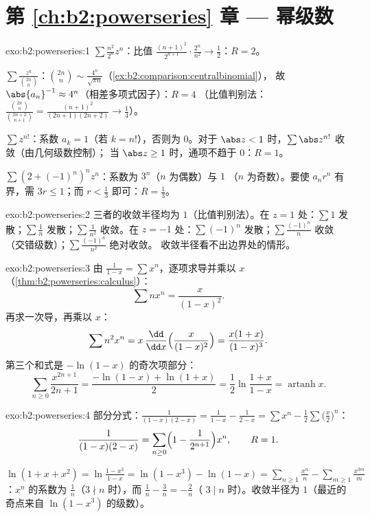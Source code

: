 \section*{第 \ref{ch:b2:powerseries} 章 --- 幂级数}

\begin{solution}{exo:b2:powerseries:1}
$\sum \frac{n^2}{2^n}z^n$：比值 $\frac{(n+1)^2}{2^{n+1}}\cdot
\frac{2^n}{n^2} \to \frac12$：$R = 2$。

$\sum \frac{z^n}{\binom{2n}{n}}$：$\binom{2n}{n} \sim
\frac{4^n}{\sqrt{\pi n}}$（\cref{ex:b2:comparison:centralbinomial}），
故 $\abs{a_n}^{-1} \approx 4^n$（相差多项式因子）：$R = 4$
（比值判别法：$\frac{\binom{2n}{n}}{\binom{2n+2}{n+1}} =
\frac{(n+1)^2}{(2n+1)(2n+2)} \to \frac14$）。

$\sum z^{n!}$：系数 $a_k = 1$（若 $k = n!$），否则为 $0$。对于
$\abs z < 1$ 时，$\sum \abs z^{n!}$ 收敛（由几何级数控制）；
当 $\abs z \geq 1$ 时，通项不趋于 $0$：$R = 1$。

$\sum (2 + (-1)^n)^n z^n$：系数为 $3^n$（$n$ 为偶数）与 $1$
（$n$ 为奇数）。要使 $a_nr^n$ 有界，需 $3r \leq 1$；而 $r <
\frac13$ 即可：$R = \frac13$。
\end{solution}

\begin{solution}{exo:b2:powerseries:2}
三者的收敛半径均为 $1$（比值判别法）。在 $z = 1$ 处：$\sum 1$
发散；$\sum\frac1n$ 发散；$\sum\frac{1}{n^2}$ 收敛。在
$z = -1$ 处：$\sum(-1)^n$ 发散；$\sum\frac{(-1)^n}{n}$ 收敛
（交错级数）；$\sum\frac{(-1)^n}{n^2}$ 绝对收敛。
收敛半径看不出边界处的情形。
\end{solution}

\begin{solution}{exo:b2:powerseries:3}
由 $\frac{1}{1-x} = \sum x^n$，逐项求导并乘以 $x$
（\cref{thm:b2:powerseries:calculus}）：
\[
\sum n x^n = \frac{x}{(1-x)^2} .
\]
再求一次导，再乘以 $x$：
\[
\sum n^2 x^n = x\,\frac{\dd}{\dd x}\Bigl(\frac{x}{(1-x)^2}\Bigr)
= \frac{x(1 + x)}{(1-x)^3} .
\]
第三个和式是 $-\ln(1 - x)$ 的奇次项部分：
\[
\sum_{n\geq0} \frac{x^{2n+1}}{2n+1}
= \frac{-\ln(1-x) + \ln(1+x)}{2}
= \frac12 \ln\frac{1+x}{1-x}
= \operatorname{artanh} x .
\]
\end{solution}

\begin{solution}{exo:b2:powerseries:4}
部分分式：$\frac{1}{(1-x)(2-x)} = \frac{1}{1-x} -
\frac{1}{2 - x} = \sum x^n - \frac12\sum \bigl(\frac x2\bigr)^n$：
\[
\frac{1}{(1-x)(2-x)} = \sum_{n\geq0} \Bigl(1 -
\frac{1}{2^{n+1}}\Bigr)x^n,
\qquad R = 1 .
\]

$\ln(1 + x + x^2) = \ln\frac{1 - x^3}{1 - x} = \ln(1 - x^3) -
\ln(1 - x) = \sum_{n\geq1}\frac{x^n}{n} -
\sum_{m\geq1}\frac{x^{3m}}{m}$：$x^n$ 的系数为
$\frac1n$（$3 \nmid n$ 时），而 $\frac1n - \frac{3}{n} = -\frac2n$（
$3 \mid n$ 时）。收敛半径为 $1$（最近的奇点来自
$\ln(1-x^3)$ 的级数）。
\end{solution}

